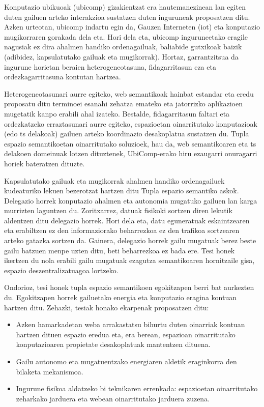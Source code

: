 \begin{resumen}
\end{resumen}



\begin{laburpena}        %

Konputazio ubikuoak (\ac{ubicomp}) gizakientzat era hautemanezinean lan egiten duten gailuen arteko interakzioa sustatzen duten inguruneak proposatzen ditu.
Azken urteotan, \ac{ubicomp} indartu egin da, Gauzen Interneten (\ac{iot}) eta konputazio mugikorraren gorakada dela eta.
Hori dela eta, \ac{ubicomp} inguruneetako eragile nagusiak ez dira ahalmen handiko ordenagailuak, baliabide gutxikoak baizik (adibidez, kapsulatutako gailuak eta mugikorrak).
Hortaz, garrantzitsua da ingurune horietan beraien heterogeneotasuna, fidagarritasun eza eta ordezkagarritasuna kontutan hartzea.


Heterogeneotasunari aurre egiteko, web semantikoak hainbat estandar eta eredu proposatu ditu terminoei esanahi zehatza emateko eta jatorrizko aplikazioen mugetatik kanpo erabili ahal izateko.
Bestalde, fidagarritasun faltari eta ordezkatzeko erraztasunari aurre egiteko, espazioetan oinarritutako konputazioak (edo \acl{ts} delakoak) gailuen arteko koordinazio desakoplatua sustatzen du.
Tupla espazio semantikoetan oinarritutako soluzioek, hau da, web semantikoaren eta \acl{ts} delakoen domeinuak lotzen dituztenek, UbiComp-erako hiru ezaugarri onuragarri horiek bateratzen dituzte.


Kapsulatutako gailuak eta mugikorrak ahalmen handiko ordenagailuek kudeaturiko lekuen bezerotzat hartzen ditu Tupla espazio semantiko askok.
Delegazio horrek konputazio ahalmen eta autonomia  mugatuko gailuen lan karga murrizten laguntzen du.
Zoritxarrez, datuak fisikoki sortzen diren lekutik aldentzen ditu delegazio horrek.
Hori dela eta, datu eguneratuak eskaintzearen eta erabiltzen ez den informaziorako beharrezkoa ez den trafikoa sortzearen arteko gatazka sortzen da.
Gainera, delegazio horrek gailu mugatuak berez beste gailu batzuen menpe uzten ditu, beti beharrezkoa ez bada ere.
Tesi honek ikertzen du nola erabili gailu mugatuak ezagutza semantikoaren hornitzaile gisa, espazio deszentralizatuagoa lortzeko.


Ondorioz, tesi honek tupla espazio semantikoen egokitzapen  berri bat aurkezten du.
Egokitzapen horrek gailuetako energia eta konputazio eragina kontuan hartzen ditu.
Zehazki, tesiak honako ekarpenak proposatzen ditu:
\begin{itemize}
  \item Azken hamarkadetan weba arrakastatsu bihurtu duten oinarriak kontuan hartzen dituen espazio eredua eta, era berean, espazioan oinarritutako konputazioaren propietate desakoplatuak mantentzen dituena. 
  \item Gailu autonomo eta mugatuentzako energiaren aldetik eraginkorra den bilaketa mekanismoa.
  \item Ingurune fisikoa aldatzeko bi teknikaren errenkada: espazioetan oinarritutako zeharkako jarduera eta webean oinarritutako jarduera zuzena.
\end{itemize}

\end{laburpena}



